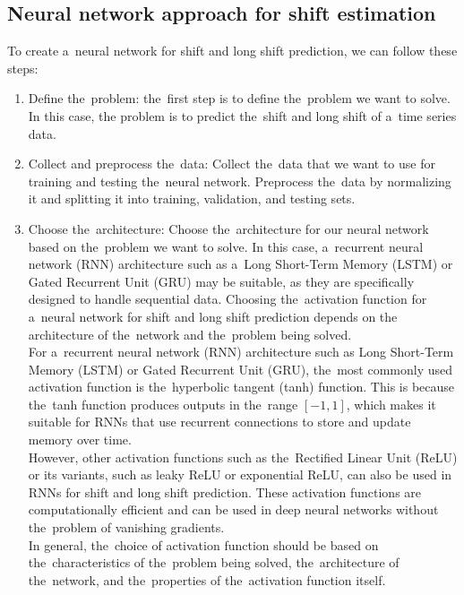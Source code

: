         \subsection{Neural network approach for shift estimation} \label{subsec:neural}
        To create a~neural network for shift and long shift prediction, we can follow these steps:
        \begin{enumerate}
            \item Define the~problem: the~first step is to define the~problem we want to solve. In this case, the
            problem is to predict the~shift and long shift of a~time series data.
            \item Collect and preprocess the~data: Collect the~data that we want to use for training and
            testing the~neural network. Preprocess the~data by normalizing it and splitting it into training,
            validation, and testing sets.
            \item Choose the~architecture: Choose the~architecture for our neural network based on the~problem
            we want to solve. In this case, a~recurrent neural network (RNN) architecture such as a~Long Short-Term
            Memory (LSTM) or Gated Recurrent Unit (GRU) may be suitable, as they are specifically designed to handle
            sequential data. Choosing the~activation function for a~neural network for shift and long shift prediction depends on the
            architecture of the~network and the~problem being solved.\\
            For a~recurrent neural network (RNN) architecture such as Long Short-Term Memory (LSTM) or
            Gated Recurrent Unit (GRU), the~most commonly used activation function is the~hyperbolic tangent (tanh) function.
            This is because the~tanh function produces outputs in the~range $[-1, 1]$, which makes it suitable for RNNs
            that use recurrent connections to store and update memory over time.\\
            However, other activation functions such as the~Rectified Linear Unit (ReLU) or its variants, such as leaky
            ReLU or exponential ReLU, can also be used in RNNs for shift and long shift prediction. These activation
            functions are computationally efficient and can be used in deep neural networks without the~problem of
            vanishing gradients.\\
            In general, the~choice of activation function should be based on the~characteristics of the~problem being
            solved, the~architecture of the~network, and the~properties of the~activation function itself.

\end{enumerate}
